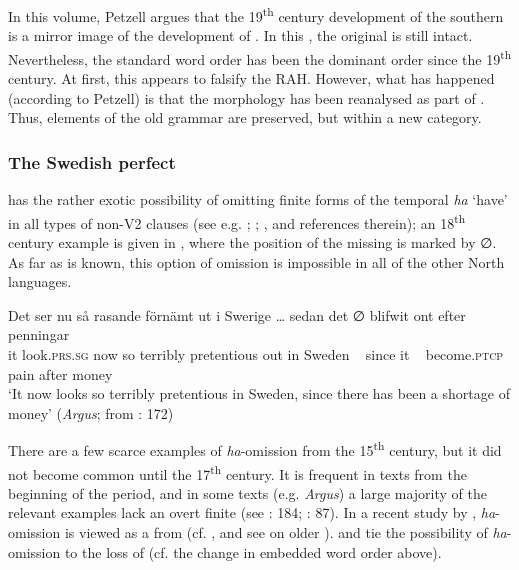\documentclass[output=paper]{langscibook}
\begin{document}
In this volume, Petzell argues that the 19\textsuperscript{th} century development of the southern   is a mirror image of the development of . In this , the original  is still intact. Nevertheless, the standard word order has been the dominant order since the 19\textsuperscript{th} century. At first, this appears to falsify the RAH. However, what has happened (according to Petzell) is that the  morphology has been reanalysed as part of . Thus, elements of the old grammar are preserved, but within a new category.


\subsubsection{ The Swedish perfect}\label{sec:intro:3.1.2}


 has the rather exotic possibility of omitting finite forms of the temporal  \textit{ha} ‘have’ in all types of non-V2 clauses (see e.g. \citealt{Julien2002}; \citealt{AndreassonEtAl2004}; \citealt{Backstrom2019}, and references therein); an 18\textsuperscript{th} century example is given in , where the position of the missing  is marked by ∅. As far as is known, this option of  omission is impossible in all of the other North  languages.


\ea\label{ex:intro:6}
\gll  Det     ser         nu   så rasande   förnämt   ut     i   Swerige … sedan   det ∅ blifwit     ont     efter penningar\\
it     look.\textsc{prs.sg}   now   so terribly   pretentious out in   Sweden ~ since   it  ~ become\textsc{.ptcp}  pain    after money\\
\glt ‘It now looks so terribly pretentious in Sweden, since there has been a shortage of money’ (\textit{Argus}; from \citealt{Johannisson1945}: 172)
\z


There are a few scarce examples of \textit{ha}{}-omission from the 15\textsuperscript{th} century, but it did not become common until the 17\textsuperscript{th} century. It is frequent in texts from the beginning of the  period, and in some texts (e.g. \textit{Argus}) a large majority of the relevant examples lack an overt finite  (see \citealt{Johannisson1945}: 184; \citealt{Backstrom2019}: 87). In a recent study by \citet{Backstrom2019}, \textit{ha}{}-omission is viewed as a  from  (cf. \citealt{Johannisson1945}, and see \citealt{Breitbarth2005} on older ). \citet{Larsson2009} and \citet{Sangfelt2019} tie the possibility of \textit{ha}{}-omission to the loss of   (cf. the change in embedded word order above).
\end{document}
